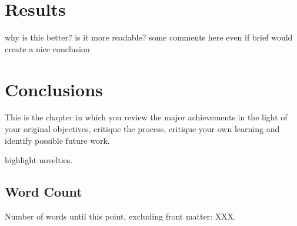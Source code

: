 \documentclass[12pt,a4paper]{report}
\theoremstyle{definition}
\theoremstyle{remark}
\begin{document}
\chapter{Results}
why is this better?
is it more readable?
some comments here even if brief would create a nice conclusion

\chapter{Conclusions}


This is the chapter in which you review the major achievements in the light of your original objectives, critique the process, critique your own learning and identify possible future work.

highlight novelties.

\vfill
\section{Word Count}
Number of words until this point, excluding front matter: XXX.



\appendix




\end{document}
